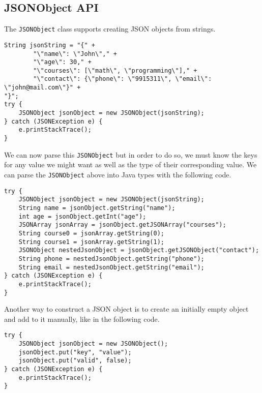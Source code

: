 \subsection{JSONObject API}
The \texttt{JSONObject} class supports creating JSON objects from strings.
\begin{lstlisting}[style=A_Java]
String jsonString = "{" +
        "\"name\": \"John\"," + 
        "\"age\": 30," +
        "\"courses\": [\"math\", \"programming\"]," +
        "\"contact\": {\"phone\": \"9915311\", \"email\": \"john@mail.com\"}" +
"}";
try {
    JSONObject jsonObject = new JSONObject(jsonString);
} catch (JSONException e) {
    e.printStackTrace();
}
\end{lstlisting}
We can now parse this \texttt{JSONObject} but in order to do so, we must know the keys for any value we might want as well as the type of their corresponding value. We can parse the \texttt{JSONObject} above into Java types with the following code.
\begin{lstlisting}[style=A_Java]
try {
    JSONObject jsonObject = new JSONObject(jsonString);
    String name = jsonObject.getString("name");
    int age = jsonObject.getInt("age");
    JSONArray jsonArray = jsonObject.getJSONArray("courses");
    String course0 = jsonArray.getString(0);
    String course1 = jsonArray.getString(1);
    JSONObject nestedJsonObject = jsonObject.getJSONObject("contact");
    String phone = nestedJsonObject.getString("phone");
    String email = nestedJsonObject.getString("email");
} catch (JSONException e) {
    e.printStackTrace();
}
\end{lstlisting}
Another way to construct a JSON object is to create an initially empty object and add to it manually, like in the following code.
\begin{lstlisting}[style=A_Java]
try {
    JSONObject jsonObject = new JSONObject();
    jsonObject.put("key", "value");
    jsonObject.put("valid", false);
} catch (JSONException e) {
    e.printStackTrace();
}
\end{lstlisting}

